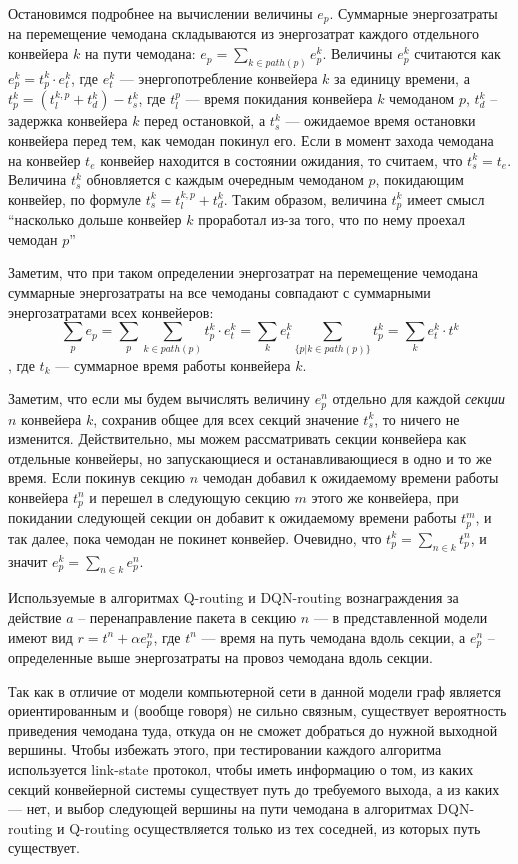 \documentclass[specification, annotation]{itmo-student-thesis}
\begin{document}
Остановимся подробнее на вычислении величины $e_p$. Суммарные энергозатраты на
перемещение чемодана складываются из энергозатрат каждого отдельного конвейера
$k$ на пути чемодана: $e_p = \sum\limits_{k \in path(p)} {e_p^k}$.
Величины $e_p^k$ считаются как $e_p^k = t_p^k \cdot e_t^k$, где $e_t^k$ ---
энергопотребление конвейера $k$ за единицу времени, а
$t_p^k = (t_l^{k,p} + t_d^k) - t_s^k$, где $t_l^p$ --- время покидания конвейера $k$
чемоданом $p$, $t_d^k$ -- задержка конвейера $k$ перед остановкой, а $t_s^k$ ---
ожидаемое время остановки конвейера перед тем, как чемодан покинул его. Если в
момент захода чемодана на конвейер $t_e$ конвейер находится в состоянии
ожидания, то считаем, что $t_s^k = t_e$. Величина $t_s^k$ обновляется с каждым
очередным чемоданом $p$, покидающим конвейер, по формуле
$t_s^k = t_l^{k,p} + t_d^k$. Таким образом, величина $t_p^k$ имеет смысл
\enquote{насколько дольше конвейер $k$ проработал из-за того, что по нему проехал
чемодан $p$}

Заметим, что при таком определении энергозатрат на перемещение чемодана
суммарные энергозатраты на все чемоданы совпадают с суммарными энергозатратами
всех конвейеров:
\[
\sum\limits_p {e_p} = \sum\limits_p {\sum\limits_{k \in path(p)} {t_p^k \cdot
    e_t^k}} = \sum\limits_k {e_t^k \sum\limits_{\{p | k \in path(p)\}} {t_p^k}}
= \sum\limits_k {e_t^k \cdot t^k} 
\],
где $t_k$ --- суммарное время работы конвейера $k$.

Заметим, что если мы будем вычислять величину $e_p^n$ отдельно для каждой
\textit{секции} $n$ конвейера $k$, сохранив общее для всех секций значение
$t_s^k$, то ничего не изменится. Действительно, мы можем рассматривать секции
конвейера как отдельные конвейеры, но запускающиеся и останавливающиеся в одно и
то же время. Если покинув секцию $n$ чемодан добавил к ожидаемому времени работы
конвейера $t_p^n$ и перешел в следующую секцию $m$ этого же конвейера, при покидании
следующей секции он добавит к ожидаемому времени работы $t_p^m$, и так далее,
пока чемодан не покинет конвейер. Очевидно, что $t_p^k = \sum_{n \in k} t_p^n$,
и значит $e_p^k = \sum_{n \in k} e_p^n$. 

Используемые в алгоритмах Q-routing и DQN-routing вознаграждения за действие $a$
-- перенаправление пакета в секцию $n$ --- в представленной модели имеют вид
$r =t^n + \alpha e_p^n$, где $t^n$ --- время на путь чемодана вдоль секции, а $e_p^n$
-- определенные выше энергозатраты на провоз чемодана вдоль секции.

Так как в отличие от модели компьютерной сети в данной модели граф является
ориентированным и (вообще говоря) не сильно связным, существует вероятность
приведения чемодана туда, откуда он не сможет добраться до нужной выходной
вершины. Чтобы избежать этого, при тестировании каждого алгоритма
используется link-state протокол, чтобы иметь информацию о том, из каких секций
конвейерной системы существует путь до требуемого выхода, а из каких --- нет, и
выбор следующей вершины на пути чемодана в алгоритмах DQN-routing и Q-routing
осуществляется только из тех соседней, из которых путь существует.
\end{document}
